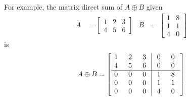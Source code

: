 For example, the matrix direct sum of $A \oplus B$ given
\begin{align*}
A &= 
\begin{bmatrix}
1 & 2 & 3 \\
4 & 5 & 6
\end{bmatrix}
& 
B &=
\begin{bmatrix}
1 & 8 \\
1 & 1 \\
4 & 0
\end{bmatrix}
\end{align*}
is
\begin{align*}
A \oplus B =
\left[\begin{array}{@{\,}wc{10pt}wc{10pt}wc{10pt}|wc{10pt}wc{10pt}}
1 & 2 & 3 & 0 & 0 \\
4 & 5 & 6 & 0 & 0 \\
\hline
0 & 0 & 0 & 1 & 8 \\
0 & 0 & 0 & 1 & 1 \\
0 & 0 & 0 & 4 & 0
\end{array}\right]
\end{align*}
